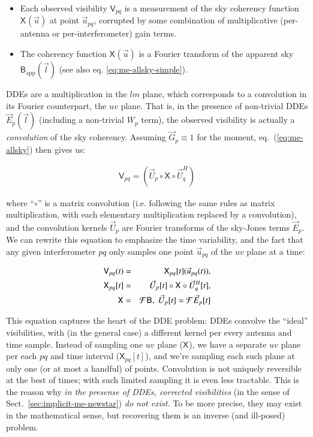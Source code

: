 \documentclass[]{aa}
\newcommand{\herm}{H}
\newcommand{\jones}[2]{\vec {#1}_{#2}}
\newcommand{\jonesT}[2]{\vec {#1}^{\herm}_{#2}}
\newcommand{\coh}[2]{\mathsf{{#1}}_{{#2}}}
\begin{document}
\begin{itemize}
\item Each observed visibility $\coh{V}{pq}$ is a measurement of the sky coherency function $\coh{X}{}(\vec u)$ at point $\vec u_{pq}$, corrupted by some combination of multiplicative (per-antenna or per-interferometer) gain terms.

\item The coherency function $\coh{X}{}(\vec u)$ is a Fourier transform of the apparent sky $\coh{B}{\mathrm{app}}(\vec l)$ (see also eq. \ref{eq:me-allsky-simple}).
\end{itemize}

DDEs are a multiplication in the $lm$ plane, which corresponds to a convolution in its Fourier counterpart, the $uv$ plane. That is, in the presence of non-trivial DDEs $\jones{E}{p}(\vec l)$ (including a non-trivial $W_p$ term), the observed visibility is actually a \emph{convolution} of the sky coherency. Assuming $\jones{G}{p}\equiv1$ for the moment, eq.~(\ref{eq:me-allsky}) then gives us:

\begin{eqnarray}\label{eq:dde-convolution}
\coh{V}{pq} = ( \jones{U}{p} \circ \coh{X}{} \circ \jonesT{U}{q} )
\end{eqnarray}

where ``$\circ$'' is a matrix convolution (i.e. following the same rules as matrix multiplication, with each elementary multiplication replaced by a convolution), and the convolution kernels $\jones{U}{p}$ are Fourier transforms of the sky-Jones terms $\jones{E}{p}$. We can rewrite this equation to emphasize the time variability, and the fact that any given interferometer $pq$ only samples one point $\vec u_{pq}$ of the $uv$ plane at a time:

\begin{eqnarray}\label{eq:dde-convolution-t}
\coh{V}{pq}(t) & = & \coh{X}{pq}[t](\vec u_{pq}(t)), \\
\nonumber \coh{X}{pq}[t] & = & \jones{U}{p}[t] \circ \coh{X}{} \circ \jonesT{U}{q}[t], \\
\nonumber \coh{X}{} & = & {\cal F} \coh{B}{}, \; \jones{U}{p}[t] = {\cal F}\jones{E}{p}[t]
\end{eqnarray}

This equation captures the heart of the DDE problem: DDEs convolve the ``ideal'' visibilities, with (in the general case) a different kernel per every antenna and time sample. Instead of sampling one $uv$ plane ($\coh{X}{}$), we have a separate $uv$ plane per each $pq$ and time interval ($\coh{X}{pq}[t]$), and we're sampling each such plane at only one (or at most a handful) of points. Convolution is not uniquely reversible at the best of times; with such limited sampling it is even less tractable. This is the reason why \emph{in the presense of DDEs, corrected visibilities} (in the sense of Sect.~\ref{sec:implicit-me-newstar}) \emph{do not exist.} To be more precise, they may exist in the mathematical sense, but recovering them is an inverse (and ill-posed) problem.
\end{document}
